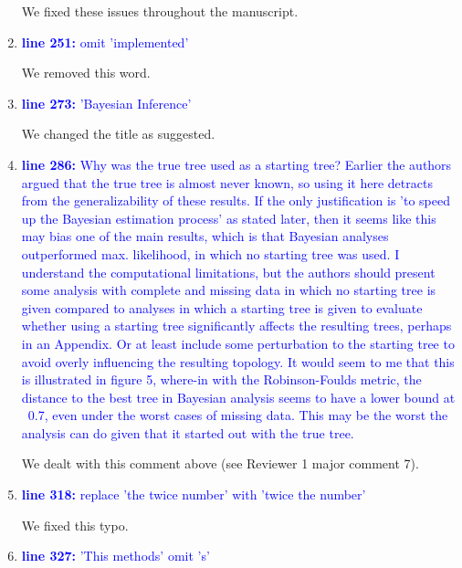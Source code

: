 \documentclass[12pt,letterpaper]{article}
\begin{document}
\begin{enumerate}
We fixed these issues throughout the manuscript.

\item{\textcolor{blue}{\textbf{line 251:} omit 'implemented'}}

We removed this word.

\item{\textcolor{blue}{\textbf{line 273:} 'Bayesian Inference'}}

We changed the title as suggested.

\item{\textcolor{blue}{\textbf{line 286:} Why was the true tree used as a starting tree? Earlier the authors argued that the true tree is almost never known, so using it here detracts from the generalizability of these results. If the only justification is 'to speed up the Bayesian estimation process' as stated later, then it seems like this may bias one of the main results, which is that Bayesian analyses outperformed max. likelihood, in which no starting tree was used. I understand the computational limitations, but the authors should present some analysis with complete and missing data in which no starting tree is given compared to analyses in which a starting tree is given to evaluate whether using a starting tree significantly affects the resulting trees, perhaps in an Appendix. Or at least include some perturbation to the starting tree to avoid overly influencing the resulting topology. It would seem to me that this is illustrated in figure 5, where-in with the Robinson-Foulds metric, the distance to the best tree in Bayesian analysis seems to have a lower bound at ~0.7, even under the worst cases of missing data. This may be the worst the analysis can do given that it started out with the true tree. }}

We dealt with this comment above (see Reviewer 1 major comment 7).

\item{\textcolor{blue}{\textbf{line 318:} replace 'the twice number' with 'twice the number'}}

We fixed this typo.

\item{\textcolor{blue}{\textbf{line 327:} 'This methods' omit 's'}}


\end{enumerate}
\end{document}
